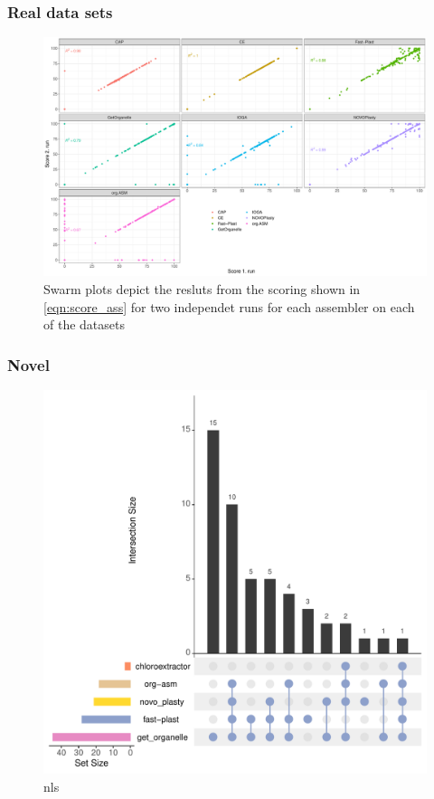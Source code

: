 \subsubsection{Real data sets}
\begin{figure}[H]
\centering
\includegraphics[height=.45\textheight, width=.95\textwidth]{Figures/repro}
\decoRule
\caption[Comparison between two uns with the same assembler for consistency testing ]{Swarm plots depict the resluts from the scoring shown in \ref{eqn:score_ass} for two independet runs for each assembler on each of the datasets}
\label{fig:consisplot}
\end{figure}


\subsubsection{Novel}


\begin{figure}[H]
\centering
\includegraphics[height=.45\textheight, width=.95\textwidth]{Figures/upset_novel}
\decoRule
\caption[Upset plot comparing the success rates for novel data sets]{nls}
\label{fig:upset_novel}
\end{figure}

